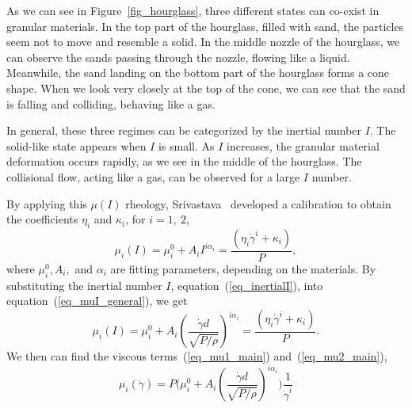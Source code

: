 As we can see in Figure~\ref{fig_hourglass}, three different states can co-exist in granular materials. 
In the top part of the hourglass, filled with sand, the particles seem not to move and resemble a solid. 
In the middle nozzle of the hourglass, we can observe the sands passing through the nozzle, flowing like a liquid.
Meanwhile, the sand landing on the bottom part of the hourglass forms a cone shape. When we look very closely at the top of the cone, we can see that the sand is falling and colliding, behaving like a gas.
\par
In general, these three regimes can be categorized by the inertial number $I$. The solid-like state appears when $I$ is small. As $I$ increases, the granular material deformation occurs rapidly, as we see in the middle of the hourglass. The collisional flow, acting like a gas, can be observed for a large $I$ number. 
\par
By applying this $\mu(I)$ rheology, Srivastava~\cite{srivastava_viscometric_2021} developed a calibration to obtain the coefficients $\eta_i$ and $\kappa_i$, for $i = 1, \ 2$,
\begin{equation}
  \mu_i(I) = \mu_i^0 + A_i{ I}^{ i \alpha_i} =  \frac{(\eta_i \dot{\gamma}^i + \kappa_i)}{P},
\label{eq_muI_general}
\end{equation}
where $\mu_i^0, A_i,$ and $\alpha_i$ are fitting parameters, depending on the materials. 
By substituting the inertial number $I$, equation~(\ref{eq_inertialI}), into equation~(\ref{eq_muI_general}),
we get
\begin{equation}
  \mu_i(I) = \mu_i^0 + A_i {\left(  \frac{\dot{\gamma} d }{\sqrt{P/\rho}}\right) }^{ i \alpha_i} =  \frac{(\eta_i \dot{\gamma}^i + \kappa_i)}{P}.
\label{eq_muI_I}
\end{equation}
We then can find the viscous terms~(\ref{eq_mu1_main}) and~(\ref{eq_mu2_main}),
\begin{equation}
  \mu_i  (\dot{\gamma})= 
 P \Biggl( \mu_i^0 + A_i {\left(  \frac{\dot{\gamma} d }{\sqrt{P/\rho}}\right) }^{ i \alpha_i}\Biggr) 
   \frac{1}{\dot{\gamma}^i}
\label{eq_eta1}
\end{equation}

